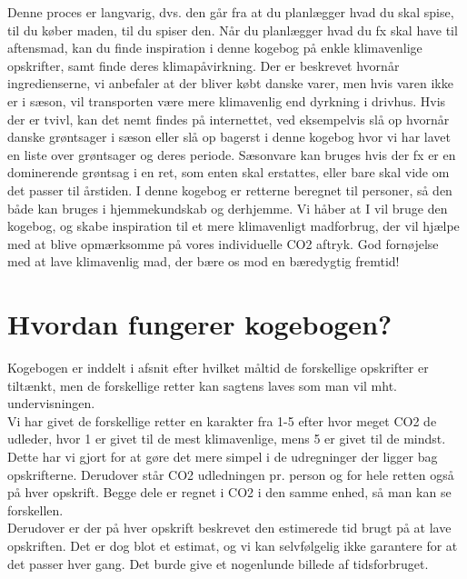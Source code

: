 \documentclass[11pt, a4paper]{article}
\begin{document}
Denne proces er langvarig, dvs. den går fra at du planlægger hvad du skal spise, til du køber maden, til du spiser den. Når du planlægger hvad du fx skal have til aftensmad, kan du finde inspiration i denne kogebog på enkle klimavenlige opskrifter, samt finde deres klimapåvirkning. Der er beskrevet hvornår ingredienserne, vi anbefaler at der bliver købt danske varer, men hvis varen ikke er i sæson, vil transporten være mere klimavenlig end dyrkning i drivhus. Hvis der er tvivl, kan det nemt findes på internettet, ved eksempelvis slå op hvornår danske grøntsager i sæson eller slå op bagerst i denne kogebog hvor vi har lavet en liste over grøntsager og deres periode. Sæsonvare kan bruges hvis der fx er en dominerende grøntsag i en ret, som enten skal erstattes, eller bare skal vide om det passer til årstiden.
I denne kogebog er retterne beregnet til \ruNumPersons{} personer, så den både kan bruges i hjemmekundskab og derhjemme. Vi håber at I vil bruge den kogebog, og skabe inspiration til et mere klimavenligt madforbrug, der vil hjælpe med at blive opmærksomme på vores individuelle CO2 aftryk. 
God fornøjelse med at lave klimavenlig mad, der bære os mod en bæredygtig fremtid!\\



\newpage
\thispagestyle{empty}
\section*{Hvordan fungerer kogebogen?}

Kogebogen er inddelt i afsnit efter hvilket måltid de forskellige opskrifter er tiltænkt, men de forskellige retter kan sagtens laves som man vil mht. undervisningen.\\

Vi har givet de forskellige retter en karakter fra 1-5 efter hvor meget CO2 de udleder, hvor 1 er givet til de mest klimavenlige, mens 5 er givet til de mindst. Dette har vi gjort for at gøre det mere simpel i de udregninger der ligger bag opskrifterne. Derudover står CO2 udledningen pr. person og for hele retten også på hver opskrift. Begge dele er regnet i CO2 i den samme enhed, så man kan se forskellen.\\

Derudover er der på hver opskrift beskrevet den estimerede tid brugt på at lave opskriften. Det er dog blot et estimat, og vi kan selvfølgelig ikke garantere for at det passer hver gang. Det burde give et nogenlunde billede af tidsforbruget.\\
\end{document}
